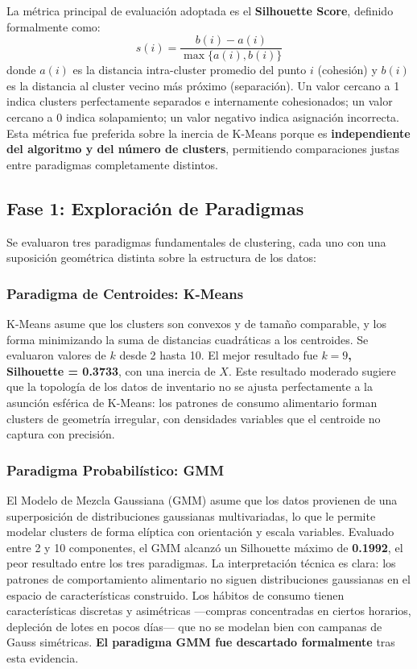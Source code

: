 \documentclass[12pt,a4paper]{article}
\newcommand{\metric}[1]{\textcolor{metricblue}{\textbf{#1}}}
\begin{document}
La métrica principal de evaluación adoptada es el \textbf{Silhouette Score}, definido formalmente como:
\[
s(i) = \frac{b(i) - a(i)}{\max\{a(i), b(i)\}}
\]
donde $a(i)$ es la distancia intra-cluster promedio del punto $i$ (cohesión) y $b(i)$ es la distancia al cluster vecino más próximo (separación). Un valor cercano a 1 indica clusters perfectamente separados e internamente cohesionados; un valor cercano a 0 indica solapamiento; un valor negativo indica asignación incorrecta. Esta métrica fue preferida sobre la inercia de K-Means porque es \textbf{independiente del algoritmo y del número de clusters}, permitiendo comparaciones justas entre paradigmas completamente distintos.

\subsection{Fase 1: Exploración de Paradigmas}

Se evaluaron tres paradigmas fundamentales de clustering, cada uno con una suposición geométrica distinta sobre la estructura de los datos:

\subsubsection{Paradigma de Centroides: K-Means}

K-Means asume que los clusters son convexos y de tamaño comparable, y los forma minimizando la suma de distancias cuadráticas a los centroides. Se evaluaron valores de $k$ desde 2 hasta 10. El mejor resultado fue \metric{$k = 9$, Silhouette = 0.3733}, con una inercia de $X$. Este resultado moderado sugiere que la topología de los datos de inventario no se ajusta perfectamente a la asunción esférica de K-Means: los patrones de consumo alimentario forman clusters de geometría irregular, con densidades variables que el centroide no captura con precisión.

\subsubsection{Paradigma Probabilístico: GMM}

El Modelo de Mezcla Gaussiana (GMM) asume que los datos provienen de una superposición de distribuciones gaussianas multivariadas, lo que le permite modelar clusters de forma elíptica con orientación y escala variables. Evaluado entre 2 y 10 componentes, el GMM alcanzó un Silhouette máximo de \metric{0.1992}, el peor resultado entre los tres paradigmas. La interpretación técnica es clara: los patrones de comportamiento alimentario no siguen distribuciones gaussianas en el espacio de características construido. Los hábitos de consumo tienen características discretas y asimétricas —compras concentradas en ciertos horarios, depleción de lotes en pocos días— que no se modelan bien con campanas de Gauss simétricas. \textbf{El paradigma GMM fue descartado formalmente} tras esta evidencia.
\end{document}
